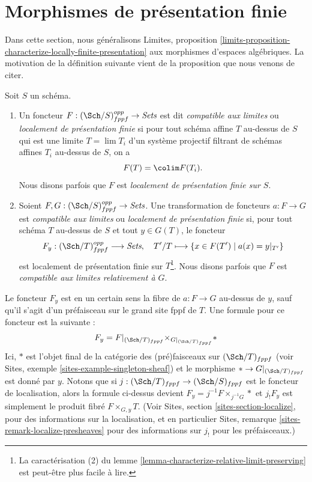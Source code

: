\section{Morphismes de présentation finie}
\label{section-finite-presentation}

\noindent
Dans cette section, nous généralisons
Limites, proposition
\ref{limits-proposition-characterize-locally-finite-presentation}
aux morphismes d'espaces algébriques.
La motivation de la définition suivante vient de
la proposition que nous venons de citer.

\begin{definition}
\label{definition-locally-finite-presentation}
Soit $S$ un schéma.
\begin{enumerate}
\item Un foncteur $F : (\Sch/S)_{fppf}^{opp} \to \textit{Sets}$
est dit {\it compatible aux limites} ou {\it localement de présentation finie} si
pour tout schéma affine $T$ au-dessus de $S$ qui est une limite $T = \lim T_i$
d'un système projectif filtrant de schémas affines $T_i$ au-dessus de $S$, on a
$$
F(T) = \colim F(T_i).
$$
Nous disons parfois que $F$ est {\it localement de présentation finie sur $S$}.
\item Soient $F, G : (\Sch/S)_{fppf}^{opp} \to \textit{Sets}$.
Une transformation de foncteurs $a : F \to G$
est {\it compatible aux limites} ou {\it localement de présentation finie}
si, pour tout schéma $T$ au-dessus de $S$ et tout $y \in G(T)$, le foncteur
$$
F_y : (\Sch/T)_{fppf}^{opp} \longrightarrow \textit{Sets}, \quad
T'/T \longmapsto \{x \in F(T') \mid a(x) = y|_{T'}\}
$$
est localement de présentation finie sur $T$\footnote{La caractérisation (2) du
lemme \ref{lemma-characterize-relative-limit-preserving}
est peut-être plus facile à lire.}. Nous disons parfois que
$F$ est {\it compatible aux limites relativement à $G$}.
\end{enumerate}
\end{definition}

\noindent
Le foncteur $F_y$ est en un certain sens la fibre de
$a : F \to G$ au-dessus de $y$, sauf qu'il s'agit d'un préfaisceau sur le grand site fppf
de $T$. Une formule pour ce foncteur est la suivante :
\begin{equation}
\label{equation-fibre-map-functors}
F_y =
F|_{(\Sch/T)_{fppf}}
{\times}_{G|_{(\Sch/T)_{fppf}}}
*
\end{equation}
Ici, $*$ est l'objet final de la catégorie des (pré)faisceaux
sur $(\Sch/T)_{fppf}$ (voir
Sites, exemple \ref{sites-example-singleton-sheaf})
et le morphisme $* \to G|_{(\Sch/T)_{fppf}}$ est donné par $y$.
Notons que si $j : (\Sch/T)_{fppf} \to (\Sch/S)_{fppf}$
est le foncteur de localisation, alors la formule ci-dessus devient
$F_y = j^{-1}F \times_{j^{-1}G} *$ et $j_!F_y$ est simplement le produit fibré
$F \times_{G, y} T$. (Voir
Sites, section \ref{sites-section-localize},
pour des informations sur la localisation, et en particulier
Sites, remarque \ref{sites-remark-localize-presheaves}
pour des informations sur $j_!$ pour les préfaisceaux.)

